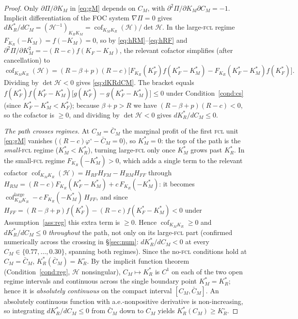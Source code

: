 \documentclass[11pt,reqno]{amsart}
\theoremstyle{plain}
\theoremstyle{definition}
\theoremstyle{remark}
\newcommand{\KR}{K_R}
\newcommand{\KF}{K_F}
\newcommand{\KM}{K_M}
\newcommand{\KRs}{K_R^{*}}
\newcommand{\KFs}{K_F^{*}}
\newcommand{\KMs}{K_M^{*}}
\newcommand{\KRo}{K_R^{\circ}}
\newcommand{\CM}{C_M}
\newcommand{\CMbar}{\bar C_M}
\newcommand{\bp}{\beta+p}
\newcommand{\FKR}{F_{\!\KR}}
\begin{document}
\begin{proof}
Only $\partial\Pi/\partial\KM$ in \eqref{eq:gM} depends on $\CM$, with
$\partial^2\Pi/\partial\KM\partial\CM=-1$. Implicit differentiation of the FOC
system $\nabla\Pi=0$ gives
$d\KRs/d\CM=(\mathcal H^{-1})_{\KR\KM}
   =\operatorname{cof}_{\KM\KR}(\mathcal H)/\det\mathcal H$.
In the large-\textsc{fcl} regime $\FKR(-\KM)=f(-\KM)=0$, so by
\eqref{eq:hRM}--\eqref{eq:hRF} and $\partial^2\Pi/\partial\KM^2=-(R-c)f(\KF-\KM)$,
the relevant cofactor simplifies (after cancellation) to
\[
  \operatorname{cof}_{\KM\KR}(\mathcal H)
  =(R-\bp)(R-c)\big[\FKR(\KFs)f(\KFs-\KMs)-\FKR(\KFs-\KMs)f(\KFs)\big].
\]
Dividing by $\det\mathcal H<0$ gives \eqref{eq:dKRdCM}. The bracket equals
$f(\KFs)f(\KFs-\KMs)\big[g(\KFs)-g(\KFs-\KMs)\big]\le 0$ under
Condition~\ref{cond:cs} (since $\KFs-\KMs<\KFs$); because $\bp>R$ we have
$(R-\bp)(R-c)<0$, so the cofactor is $\ge0$, and dividing by $\det\mathcal H<0$
gives $d\KRs/d\CM\le0$.

\emph{The path crosses regimes.} At $\CM=\CMbar$ the marginal profit of the first
\textsc{fcl} unit \eqref{eq:gM} vanishes ($(R-c)\varphi^{\circ}-\CMbar=0$), so
$\KMs=0$: the top of the path is the \emph{small}-\textsc{fcl} regime
($\KMs<\KRs$), turning large-\textsc{fcl} only once $\KMs$ grows past $\KRs$. In
the small-\textsc{fcl} regime $\FKR(-\KMs)>0$, which adds a single term to the
relevant cofactor $\operatorname{cof}_{\KM\KR}(\mathcal H)=H_{RF}H_{FM}-H_{RM}H_{FF}$
through $H_{RM}=(R-c)\FKR(\KFs-\KMs)+c\,\FKR(-\KMs)$: it becomes
$\operatorname{cof}_{\KM\KR}^{\text{large}}-c\,\FKR(-\KMs)\,H_{FF}$, and since
$H_{FF}=(R-\bp)f(\KFs)-(R-c)f(\KFs-\KMs)<0$ under Assumption~\ref{ass:reg} this
extra term is $\ge0$. Hence $\operatorname{cof}_{\KM\KR}\ge0$ and $d\KRs/d\CM\le0$
\emph{throughout} the path, not only on its large-\textsc{fcl} part (confirmed
numerically across the crossing in \S\ref{sec:num}: $d\KRs/d\CM<0$ at every
$\CM\in\{0.77,\dots,0.30\}$, spanning both regimes). Since the no-\textsc{fcl}
conditions hold at $\CM=\CMbar$, $\KRs(\CMbar)=\KRo$. By the implicit function
theorem (Condition~\ref{cond:reg}, $\mathcal H$ nonsingular), $\CM\mapsto\KRs$ is
$C^1$ on each of the two open regime intervals and continuous across the single
boundary point $\KMs=\KRs$; hence it is \emph{absolutely continuous} on the
compact interval $[\CM,\CMbar]$. An absolutely continuous function with
a.e.-nonpositive derivative is non-increasing, so integrating
$d\KRs/d\CM\le0$ from $\CMbar$ down to $\CM$ yields $\KRs(\CM)\ge\KRo$.
\end{proof}
\end{document}
